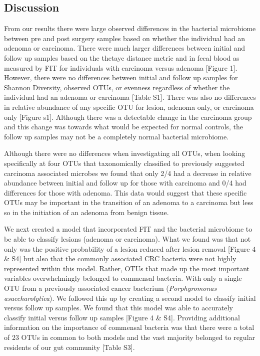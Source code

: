 \documentclass[12pt,]{article}
\begin{document}
\newpage

\subsection{Discussion}\label{discussion}

From our results there were large observed differences in the bacterial
microbiome between pre and post surgery samples based on whether the
individual had an adenoma or carcinoma. There were much larger
differences between initial and follow up samples based on the thetayc
distance metric and in fecal blood as measured by FIT for individuals
with carcinoma versus adenoma {[}Figure 1{]}. However, there were no
differences between initial and follow up samples for Shannon Diversity,
observed OTUs, or evenness regardless of whether the individual had an
adenoma or carcinoma {[}Table S1{]}. There was also no differences in
relative abundance of any specific OTU for lesion, adenoma only, or
carcinoma only {[}Figure s1{]}. Although there was a detectable change
in the carcinoma group and this change was towards what would be
expected for normal controls, the follow up samples may not be a
completely normal bacterial microbiome.

Although there were no differences when investigating all OTUs, when
looking specifically at four OTUs that taxonomically classified to
previously suggested carcinoma associated microbes we found that only
2/4 had a decrease in relative abundance between initial and follow up
for those with carcinoma and 0/4 had differences for those with adenoma.
This data would suggest that these specific OTUs may be important in the
transition of an adenoma to a carcinoma but less so in the initiation of
an adenoma from benign tissue.

We next created a model that incorporated FIT and the bacterial
microbiome to be able to classify lesions (adenoma or carcinoma). What
we found was that not only was the positive probability of a lesion
reduced after lesion removal {[}Figure 4 \& S4{]} but also that the
commonly associated CRC bacteria were not highly represented within this
model. Rather, OTUs that made up the most important variables
overwhelmingly belonged to commensal bacteria. With only a single OTU
from a previously associated cancer bacterium (\emph{Porphyromonas
asaccharolytica}). We followed this up by creating a second model to
classify initial versus follow up samples. We found that this model was
able to accurately classify initial versus follow up samples {[}Figure 4
\& S4{]}. Providing additional information on the importance of
commensal bacteria was that there were a total of 23 OTUs in common to
both models and the vast majority belonged to regular residents of our
gut community {[}Table S3{]}.
\end{document}
